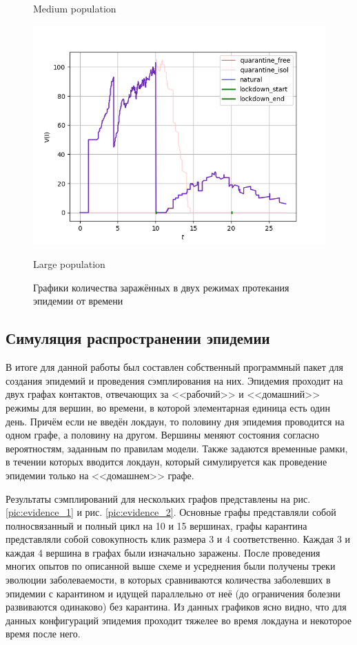 \begin{figure}[h]
\begin{minipage}{0.49\linewidth}
			\centering
			Medium population
		\end{minipage}
		\begin{center}
			\begin{minipage}{0.5\linewidth}
			\includegraphics[width=\linewidth, keepaspectratio]{../figs/basic_experiment_big_population}
			
			\centering
			Large population
		\end{minipage}
		\end{center}
		\caption{Графики количества заражённых в двух режимах протекания эпидемии от времени}\label{pic:basic}
	\end{figure}

	\subsection*{Симуляция распространении эпидемии}
	
	В итоге для данной работы был составлен собственный программный пакет для создания эпидемий и проведения сэмплирования на них. Эпидемия проходит на двух графах контактов, отвечающих за <<рабочий>> и <<домашний>> режимы для вершин, во времени, в которой элементарная единица есть один день. Причём если не введён локдаун, то половину дня эпидемия проводится на одном графе, а половину на другом. Вершины меняют состояния согласно вероятностям, заданным по правилам модели. Также задаются временные рамки, в течении которых вводится локдаун, который симулируется как проведение эпидемии только на <<домашнем>> графе.
	
	Результаты сэмплирований для нескольких графов представлены на рис. \ref{pic:evidence_1} и рис. \ref{pic:evidence_2}. Основные графы представляли собой полносвязанный и полный цикл на 10 и 15 вершинах, графы карантина представляли собой совокупность клик размера 3 и 4 соответственно. Каждая 3 и каждая 4 вершина в графах были изначально заражены. После проведения многих опытов по описанной выше схеме и усреднения были получены треки эволюции заболеваемости, в которых сравниваются количества заболевших в эпидемии с карантином и идущей параллельно от неё (до ограничения болезни развиваются одинаково) без карантина. Из данных графиков ясно видно, что для данных конфигураций эпидемия проходит тяжелее во время локдауна и некоторое время после него.
	
